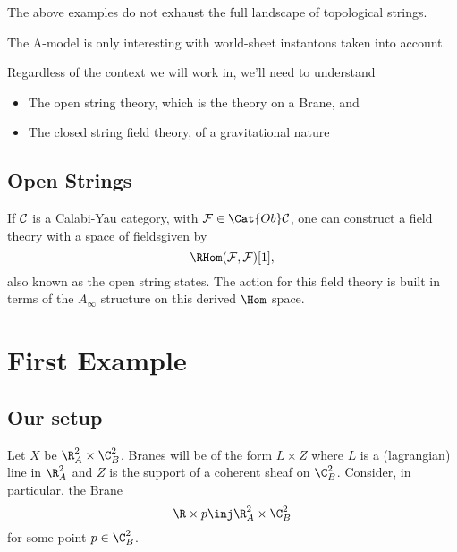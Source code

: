 \documentclass[12pt]{amsart}
\begin{document}
  \begin{rmk}
    The above examples do not exhaust the full landscape of topological
    strings. %
  \end{rmk}

  \begin{rmk}
    The A-model is only interesting with world-sheet instantons taken into
    account.
  \end{rmk}

  Regardless of the context we will work in, we'll need to understand

  \begin{itemize}
    \item The open string theory, which is the theory on a Brane, and
    \item The closed string field theory, of a gravitational nature
  \end{itemize}

  \subsection{Open Strings}
  If $\mathcal{C}$ is a Calabi-Yau category, with $\mc{F} \in \Cat{Ob}\mc{C}$, one
  can construct a field theory with a space of
  fields\footnotemark{}given by
  $$\RHom(\mc{F},\mc{F})[1],$$
  also known as the open string states. The action for this field theory is
  built in terms of the $A_{\infty}$ structure\footnotemark{} on this derived $\Hom$ space.

  \section{First Example}

  \subsection{Our setup}
  Let $X$ be $\R^2_A \times \C^2_B$. Branes will be of the form $L \times Z$
  where $L$ is a (lagrangian) line in $\R^2_A$ and $Z$ is the support of a
  coherent sheaf on $\C^2_B$. Consider, in particular, the Brane $$\R \times p
  \inj \R^2_A \times \C^2_B$$ for some point $p \in \C^2_B$.
\end{document}
